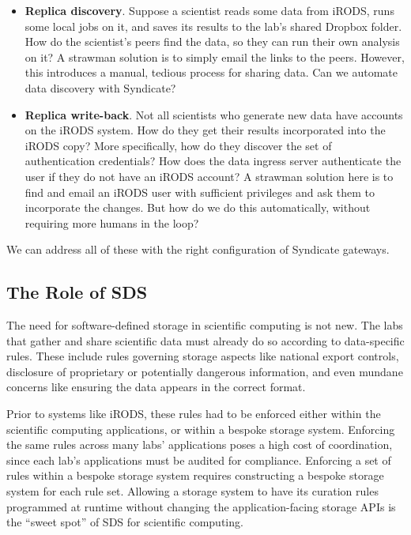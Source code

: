 \begin{itemize}
\item \textbf{Replica discovery}.  Suppose a scientist reads some data from iRODS,
runs some local jobs on it, and saves its results to the lab's shared Dropbox
folder.  How do the scientist's peers find the data, so they can run their own
analysis on it?  A strawman solution is to simply email the links to the peers.
However, this introduces a manual, tedious process for sharing data.  Can we
automate data discovery with Syndicate?
\item \textbf{Replica write-back}.  Not all scientists who generate new data
have accounts on the iRODS system.  How do they get their results incorporated
into the iRODS copy?  More specifically, how do they discover the set of
authentication credentials?  How does the data ingress server authenticate the
user if they do not have an iRODS account?  A strawman solution here is to find
and email an iRODS user with sufficient privileges and ask them to incorporate
the changes.  But how do we do this automatically, without requiring more humans
in the loop?
\end{itemize}

We can address all of these with the right configuration of Syndicate gateways.

\subsection{The Role of SDS}

The need for software-defined storage in scientific computing is not new.  The
labs that gather and share scientific data must already do so according to
data-specific rules.  These include rules governing storage aspects like
national export controls, disclosure of proprietary or potentially dangerous information, and
even mundane concerns like ensuring the data appears in the correct format.

Prior to systems like iRODS, these rules had to be enforced either within the
scientific computing applications, or within a bespoke storage system.
Enforcing the same rules across many labs' applications poses a high cost of
coordination, since each lab's applications must be audited for compliance.
Enforcing a set of rules within a bespoke storage system requires constructing a
bespoke storage system for each rule set.  Allowing a storage system to have its
curation rules programmed at runtime without changing the application-facing
storage APIs is the ``sweet spot'' of SDS for scientific computing.

